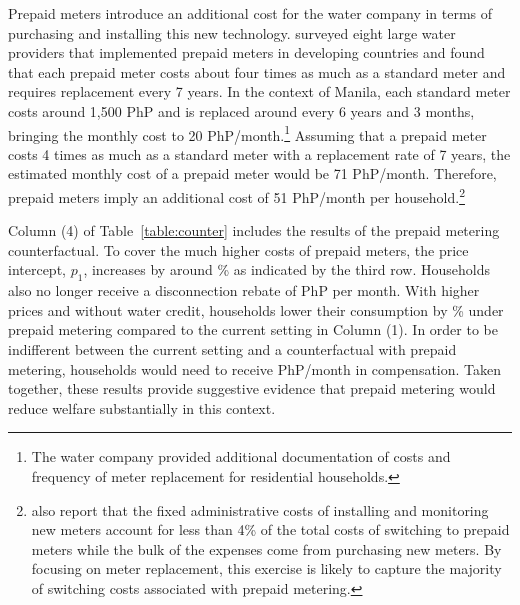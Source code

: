 \documentclass[12pt]{article}
\begin{document}

Prepaid meters introduce an additional cost for the water company in terms of purchasing and installing this new technology.  \cite{heymans2014limits} surveyed eight large water providers that implemented prepaid meters in developing countries and found that each prepaid meter costs about four times as much as a standard meter and requires replacement every 7 years.  In the context of Manila, each standard meter costs around 1,500 PhP and is replaced around every 6 years and 3 months, bringing the monthly cost to 20 PhP/month.\footnote{The water company provided additional documentation of costs and frequency of meter replacement for residential households.}  Assuming that a prepaid meter costs 4 times as much as a standard meter with a replacement rate of 7 years, the estimated monthly cost of a prepaid meter would be 71 PhP/month.  Therefore, prepaid meters imply an additional cost of 51 PhP/month per household.\footnote{\cite{heymans2014limits} also report that the fixed administrative costs of installing and monitoring new meters account for less than 4\% of the total costs of switching to prepaid meters while the bulk of the expenses come from purchasing new meters.  By focusing on meter replacement, this exercise is likely to capture the majority of switching costs associated with prepaid metering.}  

Column (4) of Table~\ref{table:counter} includes the results of the prepaid metering counterfactual.  To cover the much higher costs of prepaid meters, the price intercept, $p_1$, increases by around \unskip\% as indicated by the third row.  Households also no longer receive a disconnection rebate of PhP per month.  With higher prices and without water credit, households lower their consumption by \unskip\% under prepaid metering compared to the current setting in Column (1).  In order to be indifferent between the current setting and a counterfactual with prepaid metering, households would need to receive PhP/month in compensation.  Taken together, these results provide suggestive evidence that prepaid metering would reduce welfare substantially in this context.
\end{document}
